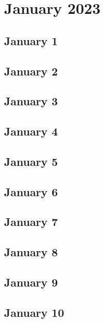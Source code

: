 %
%
%

\chapter{January 2023}
\label{intro} %

\section{January 1}

\section{January 2}

\section{January 3}

\section{January 4}

\section{January 5}

\section{January 6}

\section{January 7}

\section{January 8}

\section{January 9}

\section{January 10}

